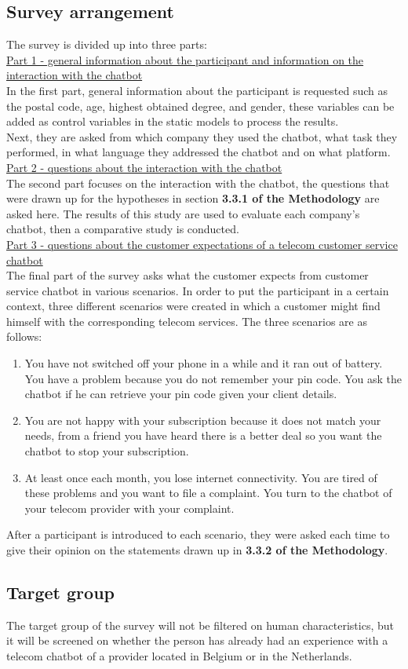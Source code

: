 \subsection{Survey arrangement}
The survey is divided up into three parts:\\
\break
\ul{Part 1 - general information about the participant and information on the interaction with the chatbot}\\
\break
In the first part, general information about the participant is requested such as the postal code, age, highest obtained degree, and gender, these variables can be added as control variables in the static models to process the results.\\
\break
Next, they are asked from which company they used the chatbot, what task they performed, in what language they addressed the chatbot and on what platform.\\
\break
\ul{Part 2 - questions about the interaction with the chatbot}\\
\break
The second part focuses on the interaction with the chatbot, the questions that were drawn up for the hypotheses in section \textbf{3.3.1 of the Methodology} are asked here. The results of this study are used to evaluate each company's chatbot, then a comparative study is conducted.\\
\break
\ul{Part 3 - questions about the customer expectations of a telecom customer service chatbot}\\
\break
The final part of the survey asks what the customer expects from customer service chatbot in various scenarios. In order to put the participant in a certain context, three different scenarios were created in which a customer might find himself with the corresponding telecom services. The three scenarios are as follows:
\begin{enumerate}
	\item You have not switched off your phone in a while and it  ran out of battery. You have a problem because you do not remember your \acrfull{pin} code. You ask the chatbot if he can retrieve your \acrshort{pin} code given your client details. 
	\item You are not happy with your subscription because it does not match your needs, from a friend you have heard there is a better deal so you want the chatbot to stop your subscription.
	\item At least once each month, you lose internet connectivity. You are tired of these problems and you want to file a complaint. You turn to the chatbot of your telecom provider with your complaint.
\end{enumerate}
After a participant is introduced to each scenario, they were asked each time to give their opinion on the statements drawn up in \textbf{3.3.2 of the Methodology}.

\subsection{Target group}
The target group of the survey will not be filtered on human characteristics, but it will be screened on whether the person has already had an experience with a telecom chatbot of a provider located in Belgium or in the Netherlands.
